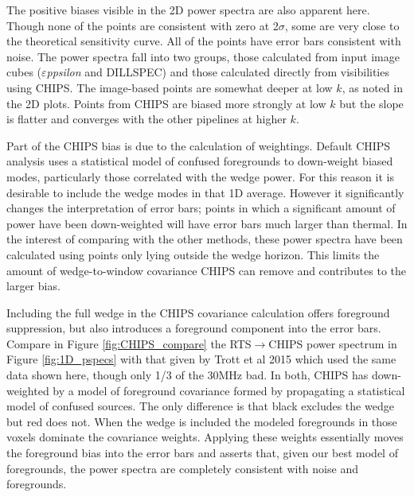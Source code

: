 \documentclass[twolcolumn,iop]{emulateapj}
\def\eppsilon{{\it $\varepsilon$ppsilon}}
\def\empirical{DILLSPEC}
\def\chipscite{Trott et al 2015}
\begin{document}
The positive biases visible in the 2D power spectra are also apparent here. Though none of the points are consistent with zero at 2$\sigma$, some are very close to the theoretical sensitivity curve. All of the points have   error bars consistent with noise. The power spectra fall into two groups, those calculated from input image cubes (\eppsilon{} and \empirical{}) and those calculated directly from visibilities using CHIPS. The image-based points are somewhat deeper at low $k$, as noted in the 2D plots.  Points from CHIPS are biased more strongly at low $k$ but the slope is flatter and converges with the other pipelines at higher $k$.  

Part of the CHIPS bias is due to the calculation of weightings. Default CHIPS analysis uses a statistical model of confused foregrounds to down-weight biased modes, particularly those correlated with the wedge power. For this reason it is desirable to include the wedge modes in that 1D average. However it significantly changes the interpretation of error bars; points in which a significant amount of power have been down-weighted will have error bars much larger than thermal. In the interest of comparing with the other methods, these power spectra have been calculated using points only lying outside the wedge horizon. This limits the amount of wedge-to-window covariance CHIPS can remove and contributes to the larger bias. 

Including the full wedge in the CHIPS covariance calculation offers foreground suppression, but also introduces a foreground component into the error bars. Compare in Figure \ref{fig:CHIPS_compare} the RTS$\to$CHIPS power spectrum in Figure \ref{fig:1D_pspecs} with that given by \chipscite{} which used the same data shown here, though only 1/3 of the 30MHz bad.  In both, CHIPS has down-weighted by a model of foreground covariance formed by propagating a statistical model of confused sources. The only difference is that black excludes the wedge but red does not. When the wedge is included the modeled foregrounds in those voxels dominate the covariance weights. Applying these weights essentially moves the foreground bias into the error bars and asserts that, given our best model of foregrounds, the power spectra are completely consistent with noise and  foregrounds.
\end{document}
